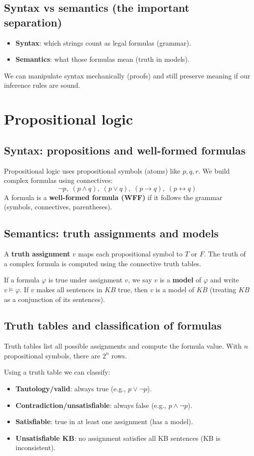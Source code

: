 \documentclass[11pt]{article}
\begin{document}
\subsection{Syntax vs semantics (the important separation)}
\begin{itemize}[leftmargin=*]
  \item \textbf{Syntax}: which strings count as legal formulas (grammar).
  \item \textbf{Semantics}: what those formulas mean (truth in models).
\end{itemize}
We can manipulate syntax mechanically (proofs) and still preserve meaning if our inference rules are sound.

\section{Propositional logic}
\subsection{Syntax: propositions and well-formed formulas}
Propositional logic uses propositional symbols (atoms) like $p,q,r$.
We build complex formulas using connectives:
\[
  \lnot p,\; (p\land q),\; (p\lor q),\; (p\rightarrow q),\; (p\leftrightarrow q)
\]
A formula is a \textbf{well-formed formula (WFF)} if it follows the grammar (symbols, connectives, parentheses).

\subsection{Semantics: truth assignments and models}
A \textbf{truth assignment} $v$ maps each propositional symbol to $T$ or $F$.
The truth of a complex formula is computed using the connective truth tables.

If a formula $\varphi$ is true under assignment $v$, we say $v$ is a \textbf{model} of $\varphi$ and write $v \models \varphi$.
If $v$ makes all sentences in $KB$ true, then $v$ is a model of $KB$ (treating $KB$ as a conjunction of its sentences).

\subsection{Truth tables and classification of formulas}
Truth tables list all possible assignments and compute the formula value.
With $n$ propositional symbols, there are $2^n$ rows.

Using a truth table we can classify:
\begin{itemize}[leftmargin=*]
  \item \textbf{Tautology/valid}: always true (e.g., $p\lor \lnot p$).
  \item \textbf{Contradiction/unsatisfiable}: always false (e.g., $p\land \lnot p$).
  \item \textbf{Satisfiable}: true in at least one assignment (has a model).
  \item \textbf{Unsatisfiable KB}: no assignment satisfies all KB sentences (KB is inconsistent).
\end{itemize}
\end{document}
